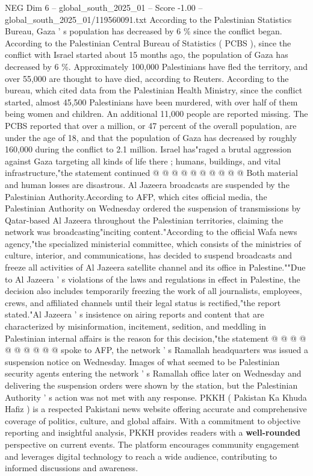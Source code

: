 \begin{textsample}{NEG Dim 6 – global\_south\_2025\_01 – Score -1.00 – global\_south\_2025\_01/119560091.txt}  \label{ex:f6_neg_087}
According to the Palestinian Statistics Bureau, Gaza ' s population has decreased by 6 \% since the conflict began.
According to the Palestinian Central Bureau of Statistics ( PCBS ), since the conflict with Israel started about 15 months ago, the population of Gaza has decreased by 6 \%.
Approximately 100,000 Palestinians have fled the territory, and over 55,000 are thought to have died, according to Reuters.
According to the bureau, which cited data from the Palestinian Health Ministry, since the conflict started, almost 45,500 Palestinians have been murdered, with over half of them being women and children.
An additional 11,000 people are reported missing.
The PCBS reported that over a million, or 47 percent of the overall population, are under the age of 18, and that the population of Gaza has decreased by roughly 160,000 during the conflict to 2.1 million.
Israel has"raged a brutal aggression against Gaza targeting all kinds of life there ; humans, buildings, and vital infrastructure,"the statement continued @ @ @ @ @ @ @ @ @ @ Both material and human losses are disastrous.
Al Jazeera broadcasts are suspended by the Palestinian Authority.According to AFP, which cites official media, the Palestinian Authority on Wednesday ordered the suspension of transmissions by Qatar-based Al Jazeera throughout the Palestinian territories, claiming the network was broadcasting"inciting content."According to the official Wafa news agency,"the specialized ministerial committee, which consists of the ministries of culture, interior, and communications, has decided to suspend broadcasts and freeze all activities of Al Jazeera satellite channel and its office in Palestine.""Due to Al Jazeera ' s violations of the laws and regulations in effect in Palestine, the decision also includes temporarily freezing the work of all journalists, employees, crews, and affiliated channels until their legal status is rectified,"the report stated."Al Jazeera ' s insistence on airing reports and content that are characterized by misinformation, incitement, sedition, and meddling in Palestinian internal affairs is the reason for this decision,"the statement @ @ @ @ @ @ @ @ @ @ spoke to AFP, the network ' s Ramallah headquarters was issued a suspension notice on Wednesday.
Images of what seemed to be Palestinian security agents entering the network ' s Ramallah office later on Wednesday and delivering the suspension orders were shown by the station, but the Palestinian Authority ' s action was not met with any response.
PKKH ( Pakistan Ka Khuda Hafiz ) is a respected Pakistani news website offering accurate and comprehensive coverage of politics, culture, and global affairs.
With a commitment to objective reporting and insightful analysis, PKKH provides readers with a \textbf{well-rounded} perspective on current events.
The platform encourages community engagement and leverages digital technology to reach a wide audience, contributing to informed discussions and awareness.

\end{textsample}
